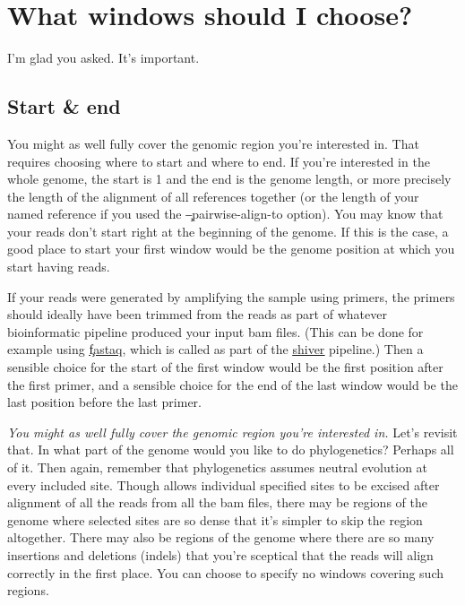 \section{What windows should I choose?}
I'm glad you asked.
It's important.

\subsection{Start \& end}

You might as well fully cover the genomic region you're interested in.
That requires choosing where to start and where to end.
If you're interested in the whole genome, the start is 1 and the end is the genome length, or more precisely the length of the alignment of all references together (or the length of your named reference if you used the \c{--pairwise-align-to} option).
You may know that your reads don't start right at the beginning of the genome.
If this is the case, a good place to start your first window would be the genome position at which you start having reads.

If your reads were generated by amplifying the sample using primers, the primers should ideally have been trimmed from the reads as part of whatever bioinformatic pipeline produced your input bam files.
(This can be done for example using \href{https://github.com/sanger-pathogens/Fastaq}{\color{blue} \underline{\c{fastaq}}}, which is called as part of the \href{https://github.com/ChrisHIV/shiver}{\c{\color{blue} \underline{shiver}}} pipeline.)
Then a sensible choice for the start of the first window would be the first position after the first primer, and a sensible choice for the end of the last window would be the last position before the last primer.

{\it You might as well fully cover the genomic region you're interested in.}
Let's revisit that.
In what part of the genome would you like to do phylogenetics?
Perhaps all of it.
Then again, remember that phylogenetics assumes neutral evolution at every included site.
Though \pmt allows individual specified sites to be excised after alignment of all the reads from all the bam files, there may be regions of the genome where selected sites are so dense that it's simpler to skip the region altogether.
There may also be regions of the genome where there are so many insertions and deletions (indels) that you're sceptical that the reads will align correctly in the first place.
You can choose to specify no windows covering such regions.

